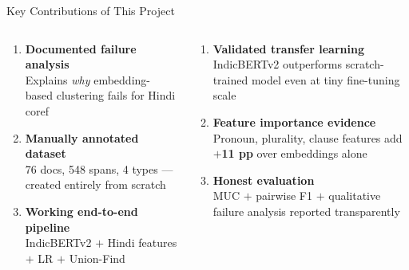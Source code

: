 \documentclass[aspectratio=169]{beamer}
\begin{document}
\begin{frame}{Key Contributions of This Project}
  \begin{columns}[T]
      \begin{tcolorbox}[rbox={Research Contributions}]
        \small
        \begin{enumerate}\setlength\itemsep{5pt}
          \item \textbf{Documented failure analysis}\\
                Explains \textit{why} embedding-based
                clustering fails for Hindi coref
          \item \textbf{Manually annotated dataset}\\
                76 docs, 548 spans, 4 types —
                created entirely from scratch
          \item \textbf{Working end-to-end pipeline}\\
                IndicBERTv2 $+$ Hindi features $+$
                LR $+$ Union-Find
        \end{enumerate}
      \end{tcolorbox}

      \begin{tcolorbox}[rbox={Empirical Contributions}]
        \small
        \begin{enumerate}\setlength\itemsep{5pt}
          \setcounter{enumi}{3}
          \item \textbf{Validated transfer learning}\\
                IndicBERTv2 outperforms scratch-trained
                model even at tiny fine-tuning scale
          \item \textbf{Feature importance evidence}\\
                Pronoun, plurality, clause features
                add \textcolor{red!70!black}{\textbf{$+$11 pp}}
                over embeddings alone
          \item \textbf{Honest evaluation}\\
                MUC $+$ pairwise F1 $+$ qualitative
                failure analysis reported transparently
        \end{enumerate}
      \end{tcolorbox}
  \end{columns}
\end{frame}

\end{document}
